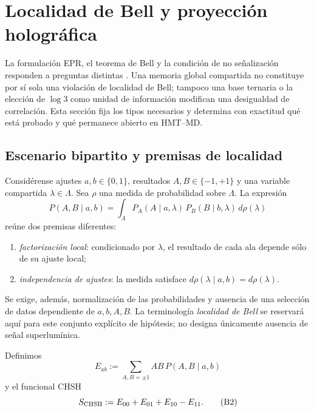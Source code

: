 \chapter{Localidad de Bell y proyección holográfica}
\label{chap:localidad-bell-proyeccion}

La formulación EPR, el teorema de Bell y la condición de no señalización
responden a preguntas distintas \cite{EinsteinPodolskyRosen1935,Bell1964,
ClauserHorneShimonyHolt1969}. Una memoria global compartida no constituye por
sí sola una violación de localidad de Bell; tampoco una base ternaria o la
elección de \(\log 3\) como unidad de información modifican una desigualdad
de correlación. Esta sección fija los tipos necesarios y determina con
exactitud qué está probado y qué permanece abierto en HMT--MD.

\section{Escenario bipartito y premisas de localidad}
\label{sec:escenario-bell-hmt}

Considérense ajustes \(a,b\in\{0,1\}\), resultados
\(A,B\in\{-1,+1\}\) y una variable compartida
\(\lambda\in\Lambda\). Sea \(\rho\) una medida de probabilidad sobre
\(\Lambda\). La expresión
\[
 P(A,B\mid a,b)
 =\int_\Lambda
 P_A(A\mid a,\lambda)\,
 P_B(B\mid b,\lambda)\,d\rho(\lambda)
 \tag{B1}\label{eq:factorizacion-bell-local}
\]
reúne dos premisas diferentes:

\begin{enumerate}
\item \emph{factorización local}: condicionado por \(\lambda\), el resultado
de cada ala depende sólo de su ajuste local;
\item \emph{independencia de ajustes}: la medida satisface
\(d\rho(\lambda\mid a,b)=d\rho(\lambda)\).
\end{enumerate}

Se exige, además, normalización de las probabilidades y ausencia de una
selección de datos dependiente de \(a,b,A,B\). La terminología
\emph{localidad de Bell} se reservará aquí para este conjunto explícito de
hipótesis; no designa únicamente ausencia de señal superlumínica.

Definimos
\[
 E_{ab}:=\sum_{A,B=\pm1}AB\,P(A,B\mid a,b)
\]
y el funcional CHSH
\[
 S_{\rm CHSH}:=E_{00}+E_{01}+E_{10}-E_{11}.
 \tag{B2}\label{eq:funcional-chsh}
\]

